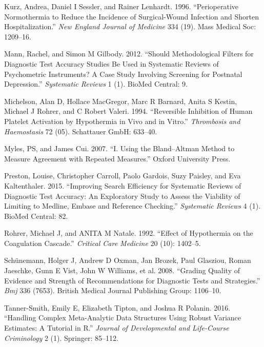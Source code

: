 \documentclass[smallextended]{svjour3}       %
\begin{document}
\leavevmode\hypertarget{ref-kurz1996perioperative}{}%
Kurz, Andrea, Daniel I Sessler, and Rainer Lenhardt. 1996.
``Perioperative Normothermia to Reduce the Incidence of Surgical-Wound
Infection and Shorten Hospitalization.'' \emph{New England Journal of
Medicine} 334 (19). Mass Medical Soc: 1209--16.

\leavevmode\hypertarget{ref-mann2012should}{}%
Mann, Rachel, and Simon M Gilbody. 2012. ``Should Methodological Filters
for Diagnostic Test Accuracy Studies Be Used in Systematic Reviews of
Psychometric Instruments? A Case Study Involving Screening for Postnatal
Depression.'' \emph{Systematic Reviews} 1 (1). BioMed Central: 9.

\leavevmode\hypertarget{ref-michelson1994reversible}{}%
Michelson, Alan D, Hollace MacGregor, Marc R Barnard, Anita S Kestin,
Michael J Rohrer, and C Robert Valeri. 1994. ``Reversible Inhibition of
Human Platelet Activation by Hypothermia in Vivo and in Vitro.''
\emph{Thrombosis and Haemostasis} 72 (05). Schattauer GmbH: 633--40.

\leavevmode\hypertarget{ref-myles2007using}{}%
Myles, PS, and James Cui. 2007. ``I. Using the Bland--Altman Method to
Measure Agreement with Repeated Measures.'' Oxford University Press.

\leavevmode\hypertarget{ref-preston2015improving}{}%
Preston, Louise, Christopher Carroll, Paolo Gardois, Suzy Paisley, and
Eva Kaltenthaler. 2015. ``Improving Search Efficiency for Systematic
Reviews of Diagnostic Test Accuracy: An Exploratory Study to Assess the
Viability of Limiting to Medline, Embase and Reference Checking.''
\emph{Systematic Reviews} 4 (1). BioMed Central: 82.

\leavevmode\hypertarget{ref-rohrer1992effect}{}%
Rohrer, Michael J, and ANITA M Natale. 1992. ``Effect of Hypothermia on
the Coagulation Cascade.'' \emph{Critical Care Medicine} 20 (10):
1402--5.

\leavevmode\hypertarget{ref-schunemann2008grading}{}%
Schünemann, Holger J, Andrew D Oxman, Jan Brozek, Paul Glasziou, Roman
Jaeschke, Gunn E Vist, John W Williams, et al. 2008. ``Grading Quality
of Evidence and Strength of Recommendations for Diagnostic Tests and
Strategies.'' \emph{Bmj} 336 (7653). British Medical Journal Publishing
Group: 1106--10.

\leavevmode\hypertarget{ref-tanner2016handling}{}%
Tanner-Smith, Emily E, Elizabeth Tipton, and Joshua R Polanin. 2016.
``Handling Complex Meta-Analytic Data Structures Using Robust Variance
Estimates: A Tutorial in R.'' \emph{Journal of Developmental and
Life-Course Criminology} 2 (1). Springer: 85--112.
\end{document}
